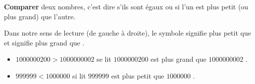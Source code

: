 \begin{defi*}{}{}
{\bf Comparer} deux nombres, c'est dire s'ils sont égaux ou si l'un est plus petit (ou plus grand) que l'autre.
\end{defi*}

\begin{notation*}{}{}
Dans notre sens de lecture (de gauche à droite), le symbole \fbox{<} signifie \og plus petit que \fg{} et \fbox{>} signifie \og plus grand que \fg{}.  
\end{notation*}

\begin{exemple*}{}{}
\begin{itemize}[label=$-$]
	\item $\num{1000000200} > \num{1000000002}$ se lit \og $\num{1000000200}$ est plus grand que $\num{1000000002}$ \fg{}. 
	\item $\num{999999}<\num{1000000}$ si lit \og $\num{999999}$ est plus petit que $\num{1000000}$ \fg{}.
\end{itemize}
\end{exemple*}